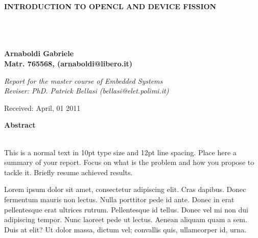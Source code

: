 \documentclass[a4paper,10pt]{article}
\newenvironment*{mytitle}{\begin{LARGE}\bf}{\end{LARGE}\\}%
\newenvironment*{mysubtitle}{\bf}{\\[1.5ex]}%
\newenvironment*{myabstract}{\begin{Large}\bf}{\end{Large}\\[2.5ex]}%
\begin{document}
\nocite{*}
\begin{mytitle}INTRODUCTION TO OPENCL AND DEVICE FISSION\end{mytitle}
\begin{mysubtitle}\end{mysubtitle}
%
%
\\
Arnaboldi Gabriele\\
Matr. 765568, (arnaboldi@libero.it)\\
\hspace{10ex}
\begin{flushright}
\emph{Report for the master course of Embedded Systems}\\
\emph{Reviser: PhD. Patrick Bellasi (bellasi@elet.polimi.it)}
\end{flushright}

Received: April, 01 2011\\
\hspace{10ex}

\begin{myabstract} Abstract \end{myabstract}
This is a normal text in 10pt type size and 12pt line spacing.
Place here a summary of your report. Focus on what is the problem and how you
propose to tackle it. Briefly resume achieved results.

Lorem ipsum dolor sit amet, consectetur adipiscing elit. Cras dapibus. Donec
fermentum mauris non lectus. Nulla porttitor pede id ante. Donec in erat
pellentesque erat ultrices rutrum. Pellentesque id tellus. Donec vel mi non dui
adipiscing tempor.  Nunc laoreet pede ut lectus. Aenean aliquam quam a sem. Duis
at elit? Ut dolor massa, dictum vel; convallis quis, ullamcorper id, urna.

\vspace{4ex}	%
\begin{multicols}{2}






\end{multicols}
\appendix


\begin{multicols}{2}





\end{multicols}
\end{document}
